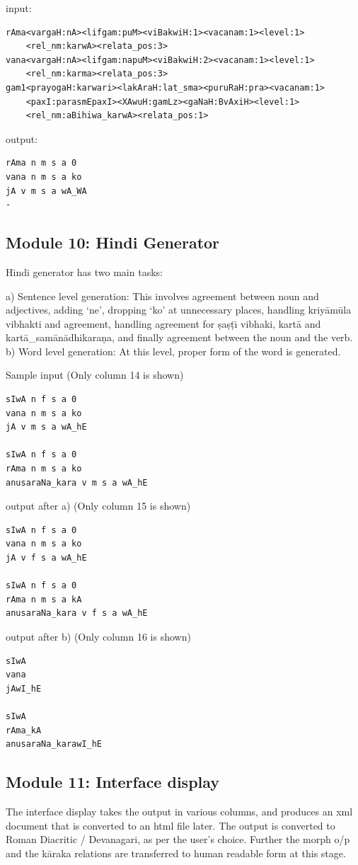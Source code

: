 \documentclass{llncs}
\begin{document}
\noindent 
input:
\begin{verbatim}
rAma<vargaH:nA><lifgam:puM><viBakwiH:1><vacanam:1><level:1>
    <rel_nm:karwA><relata_pos:3>
vana<vargaH:nA><lifgam:napuM><viBakwiH:2><vacanam:1><level:1>
    <rel_nm:karma><relata_pos:3>
gam1<prayogaH:karwari><lakAraH:lat_sma><puruRaH:pra><vacanam:1>
    <paxI:parasmEpaxI><XAwuH:gamLz><gaNaH:BvAxiH><level:1>
    <rel_nm:aBihiwa_karwA><relata_pos:1>
\end{verbatim}

\noindent 
output:
\begin{verbatim}
rAma n m s a 0
vana n m s a ko
jA v m s a wA_WA
-
\end{verbatim}

\subsection{Module 10: Hindi Generator}
Hindi generator has two main tasks:

\noindent 
a) Sentence level generation: 
This involves agreement between noun and adjectives, adding `ne', dropping `ko' at unnecessary places, handling kriy\={a}m\={u}la vibhakti and agreement, handling agreement for \d{s}a\d{s}\d{t}{\=\i} vibhaki, kart\={a} and kart\={a}\_sam\={a}n\={a}dhikara\d{n}a, and finally agreement between the noun and the verb.\\

\noindent 
b) Word level generation: At this level, proper form of the word is generated.

\noindent 
Sample input (Only column 14 is shown)
\begin{verbatim}
sIwA n f s a 0
vana n m s a ko
jA v m s a wA_hE

sIwA n f s a 0
rAma n m s a ko
anusaraNa_kara v m s a wA_hE
\end{verbatim}
output after a) (Only column 15 is shown)
\begin{verbatim}
sIwA n f s a 0
vana n m s a ko
jA v f s a wA_hE

sIwA n f s a 0
rAma n m s a kA
anusaraNa_kara v f s a wA_hE

\end{verbatim}
output after b) (Only column 16 is shown)
\begin{verbatim}
sIwA
vana
jAwI_hE

sIwA
rAma_kA
anusaraNa_karawI_hE
\end{verbatim}

\subsection{Module 11: Interface display}
The interface display takes the output in various columns, and produces an xml document that is converted to an html file later.
The output is converted to Roman Diacritic / Devanagari, as per the user's choice. Further the morph o/p and the k\={a}raka relations are transferred to human readable form at this stage.
\end{document}
